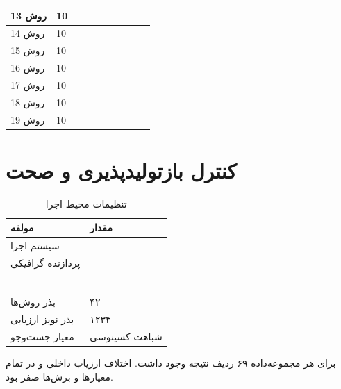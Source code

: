 \documentclass[a4paper,12pt]{article}
\begin{document}
\begin{landscape}
\begin{longtable}{|C{2.2cm}|C{1.2cm}|C{1.8cm}|C{1.8cm}|C{1.8cm}|C{1.8cm}|C{1.8cm}|C{1.8cm}|C{1.8cm}|C{2cm}|}
\hline
روش 13 & 10 &  &  &  &  &  &  &  &  \\
\hline
روش 14 & 10 &  &  &  &  &  &  &  &  \\
\hline
روش 15 & 10 &  &  &  &  &  &  &  &  \\
\hline
روش 16 & 10 &  &  &  &  &  &  &  &  \\
\hline
روش 17 & 10 &  &  &  &  &  &  &  &  \\
\hline
روش 18 & 10 &  &  &  &  &  &  &  &  \\
\hline
روش 19 & 10 &  &  &  &  &  &  &  &  \\
\hline
\end{longtable}
\end{landscape}

\section{کنترل بازتولیدپذیری و صحت}
\begin{table}[H]
\centering
\caption{تنظیمات محیط اجرا}
\begin{tabular}{|C{5.2cm}|C{9.5cm}|}
\hline
\textbf{مولفه} & \textbf{مقدار} \\
\hline
سیستم اجرا &  \\
\hline
پردازنده گرافیکی &  \\
\hline
{} &  \\
\hline
{} &  \\
\hline
{} &  \\
\hline
{} &  \\
\hline
{} &  \\
\hline
{} &  \\
\hline
بذر روش‌ها & ۴۲ \\
\hline
بذر نویز ارزیابی & ۱۲۳۴ \\
\hline
معیار جست‌وجو & شباهت کسینوسی \\
\hline
\end{tabular}
\end{table}
برای هر مجموعه‌داده ۶۹ ردیف نتیجه وجود داشت. اختلاف ارزیاب داخلی و  در تمام معیارها و برش‌ها صفر بود.
\end{document}
